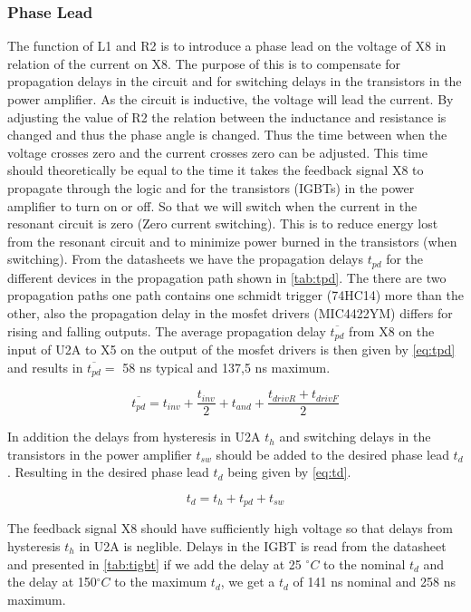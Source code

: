 \subsubsection{Phase Lead}
\label{sec:phaselead}
The function of L1 and R2 is to introduce a phase lead on the voltage of X8 in relation of the current on X8. The purpose of this is to compensate for propagation delays in the circuit and for switching delays in the transistors in the power amplifier. As the circuit is inductive, the voltage will lead the current. By adjusting the value of R2 the relation between the inductance and resistance is changed and thus the phase angle is changed. Thus the time between when the voltage crosses zero and the current crosses zero can be adjusted. This time should theoretically be equal to the time it takes the feedback signal X8 to propagate through the logic and for the transistors (IGBTs) in the power amplifier to turn on or off. So that we will switch when the current in the resonant circuit is zero (Zero current switching). This is to reduce energy lost from the resonant circuit and to minimize power burned in the transistors (when switching). From the datasheets we have the propagation delays $t_{pd}$ for the different devices in the propagation path shown in \cref{tab:tpd}. The there are two propagation paths one path contains one schmidt trigger (74HC14) more than the other, also the propagation delay in the mosfet drivers (MIC4422YM) differs for rising and falling outputs. The average propagation delay $\overline{t_{pd}}$ from X8 on the input of U2A to X5 on the output of the mosfet drivers is then given by \cref{eq:tpd} and results in $\overline{t_{pd}} =$ 58 ns typical and 137,5 ns maximum.

\begin{equation} \label{eq:tpd}
    \overline{t_{pd}} = t_{inv} + \frac{t_{inv}}{2} + t_{and} + \frac{t_{driv R}+t_{driv F}}{2}
\end{equation}

In addition the delays from hysteresis in U2A $t_h$ and switching delays in the transistors in the power amplifier $t_{sw}$ should be added to the desired phase lead $t_{d}$. Resulting in the desired phase lead $t_{d}$ being given by \cref{eq:td}.

\begin{equation} \label{eq:td}
    t_d = t_{h} + t_{pd} + t_{sw}
\end{equation}

The feedback signal X8 should have sufficiently high voltage so that delays from hysteresis $t_h$ in U2A is neglible. Delays in the IGBT is read from the datasheet and presented in \cref{tab:tigbt} if we add the delay at 25 $^{\circ}C$ to the nominal $t_d$ and the delay at 150$^{\circ}C$ to the maximum $t_d$, we get a $t_d$ of 141 ns nominal and 258 ns maximum.

